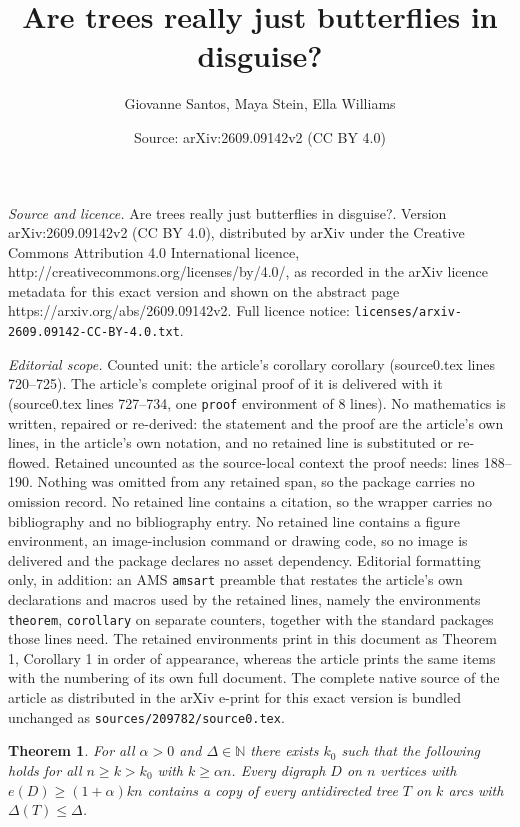 \documentclass[10pt,a4paper]{amsart}
\title{Are trees really just butterflies in disguise?}
\author{Giovanne Santos, Maya Stein, Ella Williams}
\date{Source: arXiv:2609.09142v2 (CC BY 4.0)}
\newtheorem{theorem}{Theorem}
\def\NN{\mathbb N}
\renewcommand{\geq}{\geqslant}
\renewcommand{\leq}{\leqslant}
\begin{document}
\maketitle

\noindent\emph{Source and licence.} Are trees really just butterflies in disguise?. Version arXiv:2609.09142v2 (CC BY 4.0), distributed by arXiv under the Creative Commons Attribution 4.0 International licence, http://creativecommons.org/licenses/by/4.0/, as recorded in the arXiv licence metadata for this exact version and shown on the abstract page https://arxiv.org/abs/2609.09142v2. Full licence notice: \texttt{licenses/arxiv-2609.09142-CC-BY-4.0.txt}.\par\smallskip

\noindent\textit{Editorial scope.} Counted unit: the article's corollary corollary (source0.tex lines 720--725). The article's complete original proof of it is delivered with it (source0.tex lines 727--734, one \texttt{proof} environment of 8 lines). No mathematics is written, repaired or re-derived: the statement and the proof are the article's own lines, in the article's own notation, and no retained line is substituted or re-flowed.  Retained uncounted as the source-local context the proof needs: lines 188--190.  Nothing was omitted from any retained span, so the package carries no omission record.  No retained line contains a citation, so the wrapper carries no bibliography and no bibliography entry.  No retained line contains a figure environment, an image-inclusion command or drawing code, so no image is delivered and the package declares no asset dependency.  Editorial formatting only, in addition: an AMS \texttt{amsart} preamble that restates the article's own declarations and macros used by the retained lines, namely the environments \texttt{theorem}, \texttt{corollary} on separate counters, together with the standard packages those lines need.  The retained environments print in this document as Theorem 1, Corollary 1 in order of appearance, whereas the article prints the same items with the numbering of its own full document.  The complete native source of the article as distributed in the arXiv e-print for this exact version is bundled unchanged as \texttt{sources/209782/source0.tex}.
\begin{theorem}\label{thm:main_dense}
    For all $\alpha>0$ and $\Delta\in \NN$ there exists $k_0$ such that the following holds for all $n\geq k>k_0$ with $k\geq \alpha n$. Every digraph  $D$ on $n$ vertices with $e(D)\geq (1+\alpha)kn$ contains a copy of every antidirected tree $T$ on $k$ arcs with $\Delta(T)\leq \Delta$.
\end{theorem}
\end{document}
